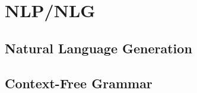 \documentclass[main.tex]{subfiles}
\begin{document}
	

	\chapter{NLP/NLG}
  
  \section{Natural Language Generation}
  
  
  \section{Context-Free Grammar}
  

	
\end{document}
